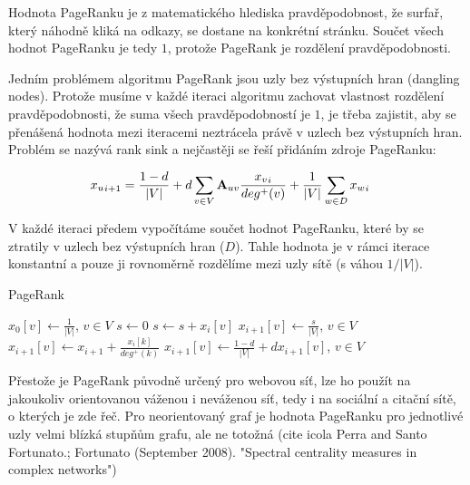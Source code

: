 \documentclass[12pt,titlepage]{report}
\begin{document}
Hodnota PageRanku je z matematického hlediska pravděpodobnost, že surfař, který
náhodně kliká na odkazy, se dostane na konkrétní stránku. Součet všech hodnot
PageRanku je tedy $1$, protože PageRank je rozdělení pravděpodobnosti.

Jedním problémem algoritmu PageRank jsou uzly bez výstupních hran (dangling
nodes). Protože musíme v každé iteraci algoritmu zachovat vlastnost rozdělení
pravděpodobnosti, že suma všech pravděpodobností je $1$, je třeba zajistit, aby
se přenášená hodnota mezi iteracemi neztrácela právě v uzlech bez výstupních
hran. Problém se nazývá rank sink a nejčastěji se řeší přidáním zdroje
PageRanku:

\begin{align}
{x_u}_{i + 1} &= \frac{1 - d}{|V|} + d \displaystyle\sum_{v \in V} {\bf A}_{uv} \frac{{x_v}_i}{deg^+ (v)} + \frac{1}{|V|} \displaystyle\sum_{w \in D} {x_w}_i
\end{align}

V každé iteraci předem vypočítáme součet hodnot PageRanku, které by se ztratily
v uzlech bez výstupních hran ($D$). Tahle hodnota je v rámci iterace konstantní
a pouze ji rovnoměrně rozdělíme mezi uzly sítě (s váhou $1/|V|$).

\begin{center}
\begin{minipage}{\textwidth}
\begin{algorithm}[H]
	\caption{PageRank}
		\label{alg:pagerank}

	\begin{algorithmic}[1]
	\Statex
	\State $x_0[v] \gets \frac{1}{|V|}$, $v \in V$
		\State $s \gets 0$
				\State $s \gets s + x_{i}[v]$
			\EndIf
		\EndFor
		\State $x_{i + 1}[v] \gets \frac{s}{|V|}$, $v \in V$
				\State $x_{i + 1}[v] \gets x_{i + 1} + \frac{x_i[k]}{deg^+(k)}$
			\EndFor
		\EndFor
		\State $x_{i + 1}[v] \gets \frac{1 - d}{|V|} + d x_{i + 1}[v]$, $v \in V$
	\EndFor
	\end{algorithmic}
\end{algorithm}
\end{minipage}
\end{center}
\mbox{}

Přestože je PageRank původně určený pro webovou síť, lze ho použít na
jakoukoliv orientovanou váženou i neváženou síť, tedy i na sociální a citační
sítě, o kterých je zde řeč. Pro neorientovaný graf je hodnota PageRanku pro
jednotlivé uzly velmi blízká stupňům grafu, ale ne totožná (cite icola Perra
and Santo Fortunato.; Fortunato (September 2008). "Spectral centrality measures
in complex networks")
\end{document}

